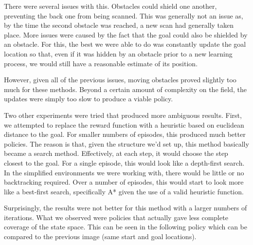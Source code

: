 \documentclass{aiaa-tc}%
\begin{document}
There were several issues with this. Obstacles could shield one
another, preventing the back one from being scanned. This was
generally not an issue as, by the time the second obstacle was
reached, a new scan had generally taken place. More issues were caused
by the fact that the goal could also be shielded by an
obstacle. For this, the best we were able to do was constantly update
the goal location so that, even if it was hidden by an obstacle prior
to a new learning process, we would still have a reasonable estimate
of its position.

However, given all of the previous issues, moving obstacles proved
slightly too much for these methods. Beyond a certain amount of
complexity on the field, the updates were simply too slow to produce a
viable policy.

Two other experiments were tried that produced more ambiguous
results. First, we attempted to replace the reward function with a
heuristic based on euclidean distance to the goal. For smaller numbers
of episodes, this produced much better policies. The reason is that,
given the structure we'd set up, this method basically became a
search method. Effectively, at each step, it
would choose the step closest to the goal. For a single episode,
this would look like a depth-first search. In the simplified
environments we were working with, there would be little or no
backtracking required. Over a number of episodes, this would start to
look more like a best-first search, specifically A* given the use of a
valid heuristic function.

Surprisingly, the results were not better for this method with a larger
numbers of iterations. What we observed were policies that actually
gave less complete coverage of the state space. This can be seen in
the following policy which can be compared to the previous image (same
start and goal locations).

\vspace{.3in}
\end{document}
